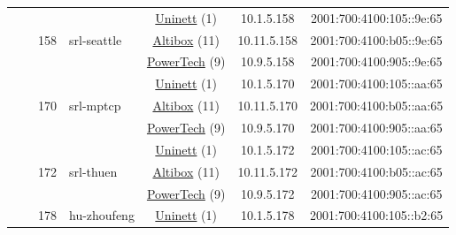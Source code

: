 \begin{small}
\begin{center}
\begin{longtable}{|c|c|c|c|c|c|c|c|}
  &  & \multirow{3}{*}{\tiny{158}} & \multicolumn{1}{|l|}{\multirow{3}{*}{\tiny{srl-seattle}}} & \multicolumn{2}{|c|}{\tiny{\href{https://www.uninett.no}{Uninett} (1)}} & \tiny{10.1.5.158} & \tiny{2001:700:4100:105::9e:65} \\* \cline{5-5}\cline{6-6}\cline{7-7}\cline{8-8}
  &  &  &  & \multicolumn{2}{|c|}{\tiny{\href{https://www.altibox.no}{Altibox} (11)}} & \tiny{10.11.5.158} & \tiny{2001:700:4100:b05::9e:65} \\* \cline{5-5}\cline{6-6}\cline{7-7}\cline{8-8}
  &  &  &  & \multicolumn{2}{|c|}{\tiny{\href{http://www.powertech.no}{PowerTech} (9)}} & \tiny{10.9.5.158} & \tiny{2001:700:4100:905::9e:65} \\* \cline{3-3}\cline{4-4}\cline{5-5}\cline{6-6}\cline{7-7}\cline{8-8}
  &  & \multirow{3}{*}{\tiny{170}} & \multicolumn{1}{|l|}{\multirow{3}{*}{\tiny{srl-mptcp}}} & \multicolumn{2}{|c|}{\tiny{\href{https://www.uninett.no}{Uninett} (1)}} & \tiny{10.1.5.170} & \tiny{2001:700:4100:105::aa:65} \\* \cline{5-5}\cline{6-6}\cline{7-7}\cline{8-8}
  &  &  &  & \multicolumn{2}{|c|}{\tiny{\href{https://www.altibox.no}{Altibox} (11)}} & \tiny{10.11.5.170} & \tiny{2001:700:4100:b05::aa:65} \\* \cline{5-5}\cline{6-6}\cline{7-7}\cline{8-8}
  &  &  &  & \multicolumn{2}{|c|}{\tiny{\href{http://www.powertech.no}{PowerTech} (9)}} & \tiny{10.9.5.170} & \tiny{2001:700:4100:905::aa:65} \\* \cline{3-3}\cline{4-4}\cline{5-5}\cline{6-6}\cline{7-7}\cline{8-8}
  &  & \multirow{3}{*}{\tiny{172}} & \multicolumn{1}{|l|}{\multirow{3}{*}{\tiny{srl-thuen}}} & \multicolumn{2}{|c|}{\tiny{\href{https://www.uninett.no}{Uninett} (1)}} & \tiny{10.1.5.172} & \tiny{2001:700:4100:105::ac:65} \\* \cline{5-5}\cline{6-6}\cline{7-7}\cline{8-8}
  &  &  &  & \multicolumn{2}{|c|}{\tiny{\href{https://www.altibox.no}{Altibox} (11)}} & \tiny{10.11.5.172} & \tiny{2001:700:4100:b05::ac:65} \\* \cline{5-5}\cline{6-6}\cline{7-7}\cline{8-8}
  &  &  &  & \multicolumn{2}{|c|}{\tiny{\href{http://www.powertech.no}{PowerTech} (9)}} & \tiny{10.9.5.172} & \tiny{2001:700:4100:905::ac:65} \\* \cline{3-3}\cline{4-4}\cline{5-5}\cline{6-6}\cline{7-7}\cline{8-8}
  &  & \multirow{3}{*}{\tiny{178}} & \multicolumn{1}{|l|}{\multirow{3}{*}{\tiny{hu-zhoufeng}}} & \multicolumn{2}{|c|}{\tiny{\href{https://www.uninett.no}{Uninett} (1)}} & \tiny{10.1.5.178} & \tiny{2001:700:4100:105::b2:65} \\* \cline{5-5}\cline{6-6}\cline{7-7}\cline{8-8}

\end{longtable}
\end{center}
\end{small}
